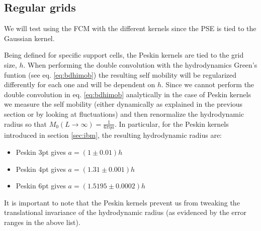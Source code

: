 \documentclass[ twoside,openright,titlepage,numbers=noenddot,%
headinclude,footinclude,cleardoublepage=empty,abstract=on,
BCOR=5mm,paper=a4,fontsize=11pt, dvipsnames
]{scrreprt}
\begin{document}
\subsection*{Regular grids}
We will test using the \gls{FCM} with the different kernels since the \gls{PSE} is tied to the Gaussian kernel.

Being defined for specific support cells, the Peskin kernels are tied to the grid size, $h$. When performing the double convolution with the hydrodynamics Green's funtion (see eq. \eqref{eq:bdhimob}) the resulting self mobility will be regularized differently for each one and will be dependent on $h$.
Since we cannot perform the double convolution in eq. \eqref{eq:bdhimob} analytically in the case of Peskin kernels we measure the self mobility (either dynamically as explained in the previous section or by looking at fluctuations) and then renormalize the hydrodynamic radius so that $M_{0}(L\rightarrow\infty) = \frac{1}{6\pi\eta a}$.
In particular, for the Peskin kernels introduced in section \ref{sec:ibm}, the resulting hydrodynamic radius are:
\begin{itemize}
\item Peskin 3pt gives $a=(1\pm 0.01) h$
\item Peskin 4pt gives $a=(1.31\pm 0.001) h$
\item Peskin 6pt gives $a=(1.5195 \pm 0.0002) h$
\end{itemize}
It is important to note that the Peskin kernels prevent us from tweaking the translational invariance of the hydrodynamic radius (as evidenced by the error ranges in the above list).
\end{document}
